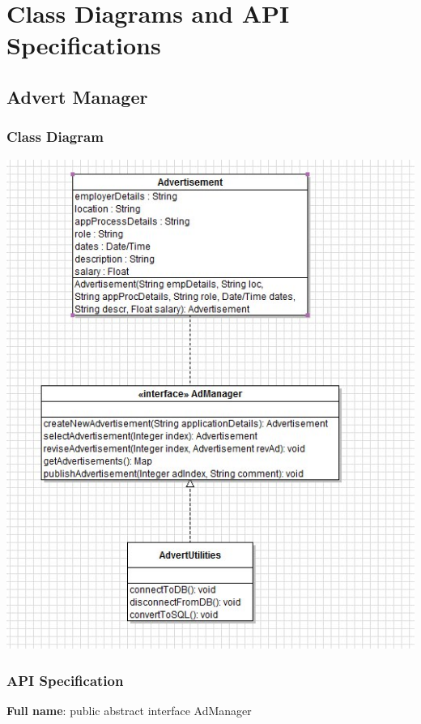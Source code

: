 \documentclass[11pt]{l3deliverable}
\begin{document}
\newpage

\section{Class Diagrams and API Specifications}

\subsection{Advert Manager}

\subsubsection{Class Diagram}

\includegraphics[width=\textwidth]{adManagerClassDiagram.png}

\subsubsection{API Specification}

\textbf{Full name}: public abstract interface AdManager\\
\end{document}
